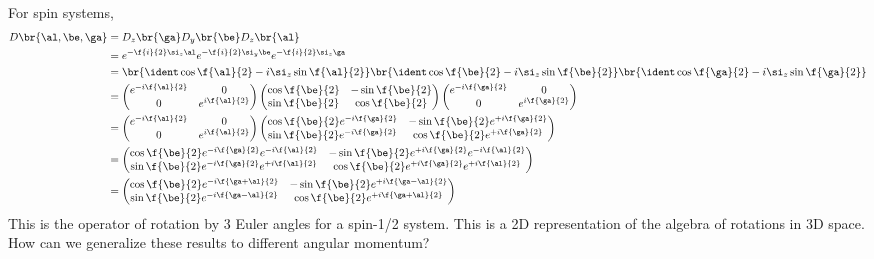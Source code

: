 \documentclass{article}
\begin{document}
For spin systems,
\begin{align*}
    D\br{\al, \be, \ga}
    &= D_z\br{\ga}D_y\br{\be}D_z\br{\al} \\
    &= e^{-\f{i}{2} \si_z \al}e^{-\f{i}{2} \si_y \be}e^{-\f{i}{2} \si_z \ga}  \\
    &= \br{\ident \cos \f{\al}{2} - i \si_z \sin \f{\al}{2}}\br{\ident \cos \f{\be}{2} - i \si_z \sin \f{\be}{2}}\br{\ident \cos \f{\ga}{2} - i \si_z \sin \f{\ga}{2}}\\
    &=
    \begin{pmatrix}
        e^{-i\f{\al}{2}} & 0 \\
        0 & e^{i\f{\al}{2}} \\
    \end{pmatrix}
    \begin{pmatrix}
        \cos \f{\be}{2} & -\sin \f{\be}{2} \\
        \sin \f{\be}{2} & \cos \f{\be}{2} \\
    \end{pmatrix}
    \begin{pmatrix}
        e^{-i\f{\ga}{2}} & 0 \\
        0 & e^{i\f{\ga}{2}} \\
    \end{pmatrix}
    \\
    &=
    \begin{pmatrix}
        e^{-i\f{\al}{2}} & 0 \\
        0 & e^{i\f{\al}{2}} \\
    \end{pmatrix}
    \begin{pmatrix}
        \cos \f{\be}{2}e^{-i\f{\ga}{2}} & -\sin \f{\be}{2}e^{+i\f{\ga}{2}} \\
        \sin \f{\be}{2}e^{-i\f{\ga}{2}} & \cos \f{\be}{2}e^{+i\f{\ga}{2}} \\
    \end{pmatrix}
    \\
    &=
    \begin{pmatrix}
        \cos \f{\be}{2}e^{-i\f{\ga}{2}}e^{-i\f{\al}{2}} & -\sin \f{\be}{2}e^{+i\f{\ga}{2}}e^{-i\f{\al}{2}} \\
        \sin \f{\be}{2}e^{-i\f{\ga}{2}}e^{+i\f{\al}{2}} & \cos \f{\be}{2}e^{+i\f{\ga}{2}}e^{+i\f{\al}{2}} \\
    \end{pmatrix}
    \\
    &= \begin{pmatrix}
        \cos \f{\be}{2}e^{-i\f{\ga+\al}{2}} & -\sin \f{\be}{2}e^{+i\f{\ga-\al}{2}} \\
        \sin \f{\be}{2}e^{-i\f{\ga - \al}{2}} & \cos \f{\be}{2}e^{+i\f{\ga+\al}{2}} \\
    \end{pmatrix}
    \\
\end{align*}
This is the operator of rotation by $3$ Euler angles for a spin-1/2 system. This is a 2D representation of the algebra of rotations in 3D space. How can we generalize these results to different angular momentum?
\end{document}
